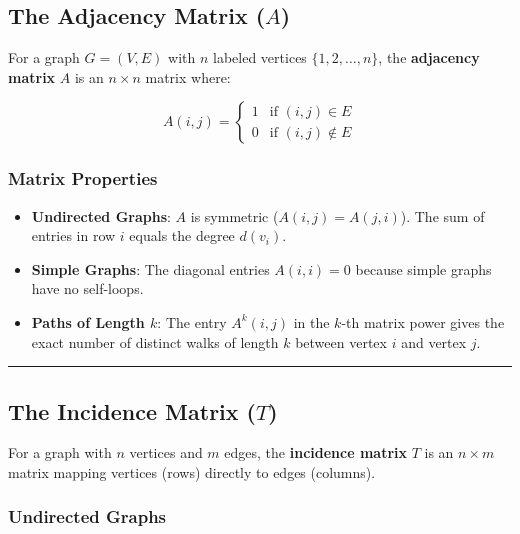 \documentclass[
]{book}
\theoremstyle{definition}
\theoremstyle{definition}
\theoremstyle{definition}
\theoremstyle{definition}
\theoremstyle{remark}
\begin{document}
\subsection{\texorpdfstring{The Adjacency Matrix (\(A\))}{The Adjacency Matrix (A)}}\label{the-adjacency-matrix-a}

For a graph \(G = (V, E)\) with \(n\) labeled vertices \(\{1, 2, \dots, n\}\), the \textbf{adjacency matrix} \(A\) is an \(n \times n\) matrix where:

\[A(i, j) = \begin{cases} 1 & \text{if } (i, j) \in E \\ 0 & \text{if } (i, j) \notin E \end{cases}\]

\subsubsection{Matrix Properties}\label{matrix-properties}

\begin{itemize}
\item
  \textbf{Undirected Graphs}: \(A\) is symmetric (\(A(i, j) = A(j, i)\)). The sum of entries in row \(i\) equals the degree \(d(v_i)\).
\item
  \textbf{Simple Graphs}: The diagonal entries \(A(i, i) = 0\) because simple graphs have no self-loops.
\item
  \textbf{Paths of Length \(k\)}: The entry \(A^k(i, j)\) in the \(k\)-th matrix power gives the exact number of distinct walks of length \(k\) between vertex \(i\) and vertex \(j\).
\end{itemize}

\begin{center}\rule{0.5\linewidth}{0.5pt}\end{center}

\subsection{\texorpdfstring{The Incidence Matrix (\(T\))}{The Incidence Matrix (T)}}\label{the-incidence-matrix-t}

For a graph with \(n\) vertices and \(m\) edges, the \textbf{incidence matrix} \(T\) is an \(n \times m\) matrix mapping vertices (rows) directly to edges (columns).

\subsubsection{Undirected Graphs}\label{undirected-graphs}
\end{document}
